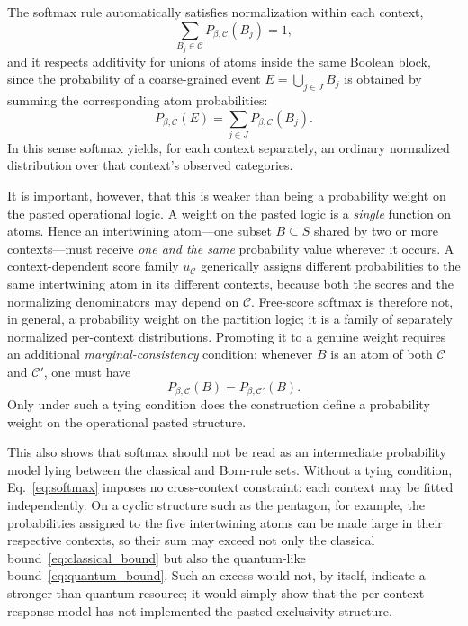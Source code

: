 \documentclass{article}
\begin{document}
The softmax rule automatically satisfies normalization within each
context,
\[
\sum_{B_j\in\mathcal C}P_{\beta,\mathcal C}(B_j)=1,
\]
and it respects additivity for unions of atoms inside the same Boolean
block, since the probability of a coarse-grained event
\(E=\bigcup_{j\in J}B_j\) is obtained by summing the corresponding atom
probabilities:
\[
P_{\beta,\mathcal C}(E)
=
\sum_{j\in J}P_{\beta,\mathcal C}(B_j).
\]
In this sense softmax yields, for each context separately, an ordinary
normalized distribution over that context's observed categories.

It is important, however, that this is weaker than being a probability
weight on the pasted operational logic. A weight on the pasted logic
is a \emph{single} function on atoms. Hence an intertwining atom---one
subset \(B\subseteq S\) shared by two or more contexts---must receive
\emph{one and the same} probability value wherever it occurs. A
context-dependent score family \(u_{\mathcal C}\) generically assigns
different probabilities to the same intertwining atom in its different
contexts, because both the scores and the normalizing denominators may
depend on \(\mathcal C\). Free-score softmax is therefore not, in
general, a probability weight on the partition logic; it is a family
of separately normalized per-context distributions. Promoting it to a
genuine weight requires an additional \emph{marginal-consistency}
condition: whenever \(B\) is an atom of both \(\mathcal C\) and
\(\mathcal C'\), one must have
\[
P_{\beta,\mathcal C}(B)=P_{\beta,\mathcal C'}(B).
\]
Only under such a tying condition does the construction define a
probability weight on the operational pasted structure.

This also shows that softmax should not be read as an intermediate
probability model lying between the classical and Born-rule sets.
Without a tying condition, Eq.~\eqref{eq:softmax} imposes no
cross-context constraint: each context may be fitted independently.
On a cyclic structure such as the pentagon, for example, the
probabilities assigned to the five intertwining atoms can be made
large in their respective contexts, so their sum may exceed not only
the classical bound~\eqref{eq:classical_bound} but also the
quantum-like bound~\eqref{eq:quantum_bound}. Such an excess would not,
by itself, indicate a stronger-than-quantum resource; it would simply
show that the per-context response model has not implemented the
pasted exclusivity structure.
\end{document}
